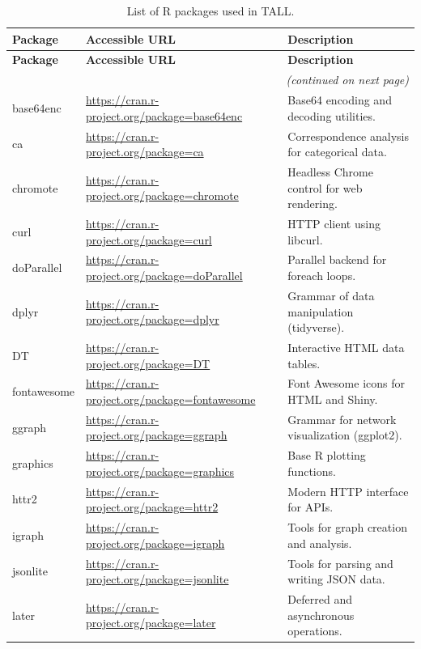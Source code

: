 \documentclass[8pt,a4paper]{article}
\begin{document}
\begin{longtable}{p{3cm} p{5.5cm} p{7.5cm}}
\caption{List of \textsf{R} packages used in TALL.} \\
\toprule
\textbf{Package} & \textbf{Accessible URL} & \textbf{Description} \\
\midrule
\endfirsthead
\toprule
\textbf{Package} & \textbf{Accessible URL} & \textbf{Description} \\
\midrule
\endhead
\midrule
\multicolumn{3}{r}{\textit{(continued on next page)}} \\
\midrule
\endfoot
\bottomrule
\endlastfoot
\textsf{base64enc} & \url{https://cran.r-project.org/package=base64enc} & Base64 encoding and decoding utilities. \\
\textsf{ca} & \url{https://cran.r-project.org/package=ca} & Correspondence analysis for categorical data. \\
\textsf{chromote} & \url{https://cran.r-project.org/package=chromote} & Headless Chrome control for web rendering. \\
\textsf{curl} & \url{https://cran.r-project.org/package=curl} & HTTP client using libcurl. \\
\textsf{doParallel} & \url{https://cran.r-project.org/package=doParallel} & Parallel backend for foreach loops. \\
\textsf{dplyr} & \url{https://cran.r-project.org/package=dplyr} & Grammar of data manipulation (tidyverse). \\
\textsf{DT} & \url{https://cran.r-project.org/package=DT} & Interactive HTML data tables. \\
\textsf{fontawesome} & \url{https://cran.r-project.org/package=fontawesome} & Font Awesome icons for HTML and Shiny. \\
\textsf{ggraph} & \url{https://cran.r-project.org/package=ggraph} & Grammar for network visualization (ggplot2). \\
\textsf{graphics} & \url{https://cran.r-project.org/package=graphics} & Base \textsf{R} plotting functions. \\
\textsf{httr2} & \url{https://cran.r-project.org/package=httr2} & Modern HTTP interface for APIs. \\
\textsf{igraph} & \url{https://cran.r-project.org/package=igraph} & Tools for graph creation and analysis. \\
\textsf{jsonlite} & \url{https://cran.r-project.org/package=jsonlite} & Tools for parsing and writing JSON data. \\
\textsf{later} & \url{https://cran.r-project.org/package=later} & Deferred and asynchronous operations. \\

\end{longtable}
\end{document}
